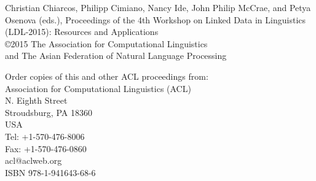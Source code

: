 \documentclass[8pt,a4paper]{article}
\begin{document}
\thispagestyle{empty}

\newpage
\thispagestyle{empty}

\mbox{}
\vspace{13.25cm}

\noindent Christian Chiarcos, Philipp Cimiano, Nancy Ide, John Philip McCrae, and Petya Osenova (eds.), Proceedings of the 4th Workshop on Linked Data in Linguistics (LDL-2015): Resources and Applications\\

\noindent \copyright 2015 The Association for Computational Linguistics\\
\noindent and The Asian Federation of Natural Language Processing

\noindent Order copies of this and other ACL proceedings from:\\

\noindent Association for Computational Linguistics (ACL)\\
 N. Eighth Street\\
\noindent Stroudsburg, PA 18360\\
\noindent USA\\
\noindent Tel: +1-570-476-8006\\
\noindent Fax: +1-570-476-0860\\
\noindent acl@aclweb.org\\

\noindent ISBN 978-1-941643-68-6



%  
%  
% 
% 
% 
% 
% 
% 
% 
% 
% 
% 
% 
% 
\end{document}
